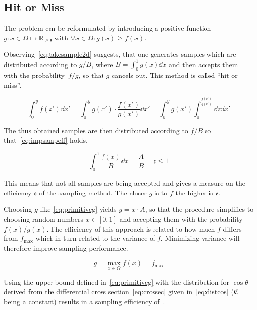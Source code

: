 \subsection{Hit or Miss}%
\label{sec:hitmiss}

The problem can be reformulated by introducing a
positive function \(g\colon x\in\Omega\mapsto\mathbb{R}_{\geq 0}\)
with \(\forall x\in\Omega\colon g(x)\geq
f(x)\).

Observing~\eqref{eq:takesample2d} suggests, that one generates
samples which are distributed according to \(g/B\), where \(B=\int_0^1g(x)\dd{x}\) and then accepts them
with the probability~\(f/g\), so that \(g\) cancels out. This method
is called ``hit or miss''.

\begin{equation}
  \label{eq:takesample2d}
  \int_{0}^{y}f(x')\dd{x'} =
  \int_{0}^{y}g(x')\cdot\frac{f(x')}{g(x')}\dd{x'}
  = \int_{0}^{y}g(x')\int_{0}^{\frac{f(x')}{g(x')}}\dd{z}\dd{x'}
\end{equation}

The thus obtained samples are then distributed according to \(f/B\) so
that~\eqref{eq:impsampeff} holds.

\begin{equation}
  \label{eq:impsampeff}
  \int_0^1\frac{f(x)}{B}\dd{x} = \frac{A}{B} = \mathfrak{e}\leq 1
\end{equation}

This means that not all samples are being accepted and gives a measure
on the efficiency \(\mathfrak{e}\) of the sampling method. The closer
\(g\) is to \(f\) the higher is \(\mathfrak{e}\).

Choosing \(g\) like~\eqref{eq:primitiveg} yields \(y = x\cdot A\), so
that the procedure simplifies to choosing random numbers
\(x\in [0,1]\) and accepting them with the probability
\(f(x)/g(x)\). The efficiency of this approach is related to how much
\(f\) differs from \(f_{\text{max}}\) which in turn related to the
variance of \(f\). Minimizing variance will therefore improve sampling
performance.

\begin{equation}
  \label{eq:primitiveg}
  g=\max_{x\in\Omega}f(x)=f_{\text{max}}
\end{equation}

Using the upper bound defined in~\eqref{eq:primitiveg} with the
distribution for \(\cos\theta\) derived from the differential cross
section~\eqref{eq:crossec} given in~\eqref{eq:distcos}
(\(\mathfrak{C}\) being a constant) results in a sampling efficiency
of~.

